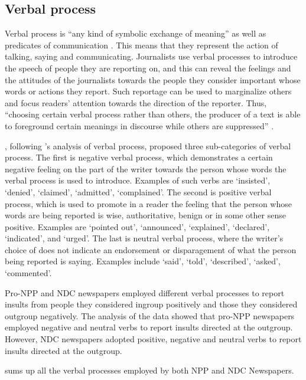 \documentclass[output=paper,modfonts]{langscibook}
\begin{document}
\subsection{Verbal process}\label{sec:ofori:3.3}
\largerpage

Verbal process is “any kind of symbolic exchange of meaning” as well as predicates of communication \citep{Halliday1985}. This means that they represent the action of talking, saying and communicating. Journalists use verbal processes to introduce the speech of people they are reporting on, and this can reveal the feelings and the attitudes of the journalists towards the people they consider important whose words or actions they report. Such reportage can be used to marginalize others and focus readers’ attention towards the direction of the reporter. Thus, “choosing certain verbal process rather than others, the producer of a text is able to foreground certain meanings in discourse while others are suppressed” \citep[34]{Chen2005}.

\citet{Chen2005}, following \citeauthor{Halliday1985}’s analysis of verbal process, proposed three sub-cat\-e\-go\-ries of verbal process. The first is negative verbal process, which demonstrates a certain negative feeling on the part of the writer towards the person whose words the verbal process is used to introduce. Examples of such verbs are ‘insisted’, ‘denied’, ‘claimed’, ‘admitted’, ‘complained’. The second is positive verbal process, which is used to promote in a reader the feeling that the person whose words are being reported is wise, authoritative, benign or in some other sense positive. Examples are ‘pointed out’, ‘announced’, ‘explained’, ‘declared’, ‘indicated’, and ‘urged’. The last is neutral verbal process, where the writer’s choice of  does not indicate an endorsement or disparagement of what the person being reported is saying. Examples include ‘said’, ‘told’, ‘described’, ‘asked’, ‘commented’.

Pro-NPP and NDC newspapers employed different verbal processes to report insults from people they considered ingroup positively and those they considered outgroup negatively. The analysis of the data showed that pro-NPP newspapers employed negative and neutral verbs to report insults directed at the outgroup. However, NDC newspapers adopted positive, negative and neutral verbs to report insults directed at the outgroup.

 sums up all the verbal processes employed by both NPP and NDC Newspapers.
\end{document}
